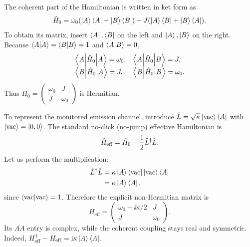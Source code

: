 The coherent part of the Hamiltonian is written in ket form as
\begin{equation}
\hat{H}_0=\omega_0(\left|A\right\rangle\left\langle A\right|+\left|B\right\rangle\left\langle B\right|)
 +J(\left|A\right\rangle\left\langle B\right|+\left|B\right\rangle\left\langle A\right|).
\end{equation}
To obtain its matrix, insert $\left\langle A\right|,\left\langle B\right|$ on the left and
$\left|A\right\rangle,\left|B\right\rangle$ on the right. Because
$\left\langle A\middle|A\right\rangle=\left\langle B\middle|B\right\rangle=1$ and $\left\langle A\middle|B\right\rangle=0$,
\begin{equation}
\begin{array}{ll}
\left\langle A\middle|\hat{H}_0\middle|A\right\rangle=\omega_0,&\left\langle A\middle|\hat{H}_0\middle|B\right\rangle=J,\\
\left\langle B\middle|\hat{H}_0\middle|A\right\rangle=J,&\left\langle B\middle|\hat{H}_0\middle|B\right\rangle=\omega_0.
\end{array}
\end{equation}
Thus $H_0=\left(\begin{smallmatrix}
\omega_0&J\\J&\omega_0
\end{smallmatrix}\right)$ is Hermitian.

To represent the monitored emission channel, introduce
$\hat{L}=\sqrt{\kappa}\left|\mathrm{vac}\right\rangle\left\langle A\right|$
with $\left|\mathrm{vac}\right\rangle=\left|0,0\right\rangle$. The standard
no-click (no-jump) effective Hamiltonian is
\begin{equation}
\hat{H}_{\mathrm{eff}}=\hat{H}_0-\frac{\mathrm{i}}{2}\hat{L}^\dagger\hat{L}.
\end{equation}
Let us perform the multiplication:
\begin{equation}
\begin{aligned}
\hat{L}^\dagger\hat{L}
&=\kappa\left|A\right\rangle\left\langle\mathrm{vac}\right|
 \left|\mathrm{vac}\right\rangle\left\langle A\right|\\
&=\kappa\left|A\right\rangle\left\langle A\right|,
\end{aligned}
\end{equation}
since $\left\langle\mathrm{vac}\middle|\mathrm{vac}\right\rangle=1$.
Therefore the explicit non-Hermitian matrix is
\begin{equation}
\boxed{H_{\mathrm{eff}}=
\begin{pmatrix}\omega_0-\ii\kappa/2&J\\
J&\omega_0\end{pmatrix}.}
\label{eq:nh-explicit-matrix}
\end{equation}
Its $AA$ entry is complex, while the coherent coupling stays
real and symmetric. Indeed,
$H_{\mathrm{eff}}^\dagger-H_{\mathrm{eff}}
=\mathrm{i}\kappa\left|A\right\rangle\left\langle A\right|$.

